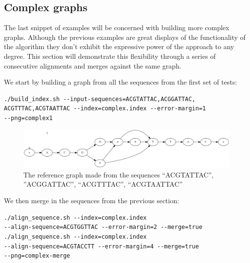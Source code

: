 \documentclass[thesis.tex]{subfiles}
\begin{document}
\subsection*{Complex graphs}
The last snippet of examples will be concerned with building more complex graphs. Although the previous examples are great displays of the functionality of the algorithm they don't exhibit the expressive power of the approach to any degree. This section will demonstrate this flexibility through a series of consecutive alignments and merges against the same graph.\\
\par\noindent
We start by building a graph from all the sequences from the first set of tests:\\
\par\noindent
\texttt{./build\_index.sh -{}-input-sequences=ACGTATTAC,ACGGATTAC,\\ACGTTTAC,ACGTAATTAC -{}-index=complex.index -{}-error-margin=1 \\-{}-png=complex1}\\
\par\noindent
\begin{figure}[H]
  \begin{mdframed}
  \includegraphics[width=\textwidth]{output/complex.png}
  \caption{The reference graph made from the sequences ``ACGTATTAC'', ''ACGGATTAC'', ``ACGTTTAC'', ``ACGTAATTAC''}
  \label{fig:validation_complex_ref}
  \end{mdframed}
\end{figure}
\noindent
We then merge in the sequences from the previous section:\\
\par\noindent
\texttt{./align\_sequence.sh -{}-index=complex.index \\
-{}-align-sequence=ACGTGGTTAC -{}-error-margin=2 -{}-merge=true}\\
\texttt{./align\_sequence.sh -{}-index=complex.index \\
-{}-align-sequence=ACGTACCTT -{}-error-margin=4 -{}-merge=true \\
-{}-png=complex-merge}\\
\clearpage\noindent
\end{document}
